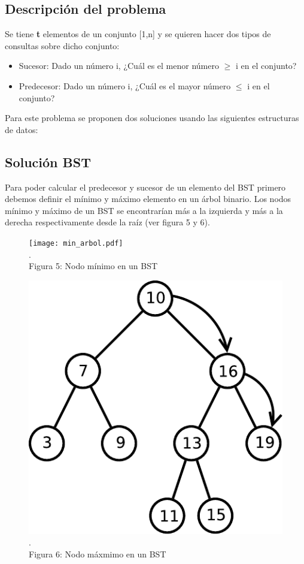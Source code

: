\documentclass[11pt]{article}
\begin{document}
\subsection{Descripción del problema}
Se tiene \textbf{t} elementos de un conjunto [1,n] y se quieren hacer dos tipos de consultas sobre dicho conjunto:
\begin{itemize}
\item Sucesor: Dado un número i, ¿Cuál es el menor número $\geq$ i en el conjunto?
\item Predecesor: Dado un número i, ¿Cuál es el mayor número $\leq$ i en el conjunto?
\end{itemize}
Para este problema se proponen dos soluciones usando las siguientes estructuras de datos:
\subsection{Solución BST}
Para poder calcular el predecesor y sucesor de un elemento del BST primero debemos definir el mínimo y máximo elemento en un árbol binario. Los nodos mínimo y máximo de un BST se encontrarían más a la izquierda y más a la derecha respectivamente desde la raíz (ver figura 5 y 6). 
\begin{figure}[htp]
\centering
\begin{minipage}{.4\textwidth}
\centering
\texttt{[image: min\_arbol.pdf]}
\\\scriptsize{\color{white}.\color{black}\\Figura 5: Nodo mínimo en un BST}
\label{etiqueta}
\end{minipage}
\begin{minipage}{.4\textwidth}
\centering
\includegraphics[scale=0.5]{max_arbol.pdf}
\\\scriptsize{\color{white}.\color{black}\\Figura 6: Nodo máxmimo en un BST}
\label{etiqueta}
\end{minipage}
\end{figure}
\end{document}
